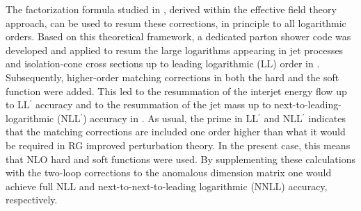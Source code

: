 \documentclass[11pt,a4paper]{article}
\begin{document}
The factorization formula studied in \cite{Becher:2015hka,Becher:2016mmh}, derived within the effective field theory approach, can be used to resum these corrections, in principle to all logarithmic orders. Based on this theoretical framework, a dedicated parton shower code was developed and applied to resum the large logarithms appearing in jet processes and isolation-cone cross sections up to leading logarithmic (LL) order  in \cite{Balsiger:2018ezi}. Subsequently, higher-order matching corrections in both the hard and the soft function were added. This led to the resummation of the interjet energy flow up to LL$^\prime$ accuracy and to the resummation of the jet mass up to next-to-leading-logarithmic (NLL$^\prime$) accuracy in \cite{Balsiger:2019tne}. As usual, the prime in LL$^\prime$ and NLL$^\prime$ indicates that the matching corrections are included one order higher than what it would be required in RG improved perturbation theory. In the present case, this means that NLO hard and soft functions were used. By supplementing these calculations with the two-loop corrections to the anomalous dimension matrix one would achieve full NLL and next-to-next-to-leading logarithmic (NNLL) accuracy, respectively.  
\end{document}
